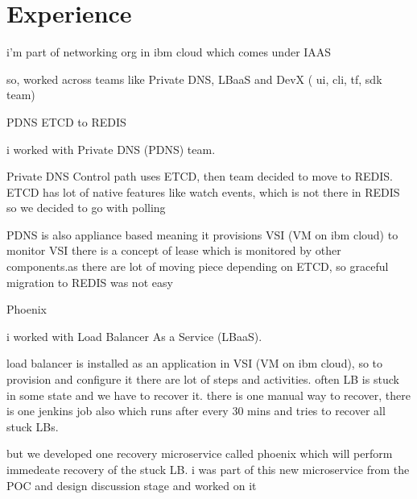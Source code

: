 \documentclass[]{deedy-resume-reversed}
\begin{document}
%
%

%
%

%
%

\begin{minipage}[t]{0.60\textwidth}


\section{Experience}
\vspace{\topsep} %
\begin{tightemize}

\item i'm part of networking org in ibm cloud which comes under IAAS
\item so, worked across teams like Private DNS, LBaaS and DevX ( ui, cli, tf, sdk team)
\item PDNS ETCD to REDIS
\item i worked with Private DNS (PDNS) team.
\item Private DNS Control path uses ETCD, then team decided to move to REDIS. ETCD has lot of native features like watch events, which is not there in REDIS so we decided to go with polling
\item PDNS is also appliance based meaning it provisions VSI (VM on ibm cloud) to monitor VSI there is a concept of lease which is monitored by other components.as there are lot of moving piece depending on ETCD, so graceful migration to REDIS was not easy

\item Phoenix
\item i worked with Load Balancer As a Service (LBaaS).
\item load balancer is installed as an application in VSI (VM on ibm cloud), so to provision and configure it there are lot of steps and activities. often LB is stuck in some state and we have to recover it.
there is one manual way to recover, there is one jenkins job also which runs after every 30 mins and tries to recover all stuck LBs.
\item but we developed one recovery microservice called phoenix which will perform immedeate recovery of the stuck LB. i was part of this new microservice from the POC and design discussion stage and worked on it


\end{tightemize}
\end{minipage}
\end{document}

